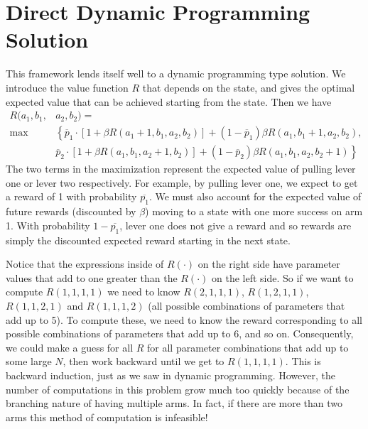 \section*{Direct Dynamic Programming Solution}
This framework lends itself well to a dynamic programming type solution.
We introduce the value function $R$ that depends on the state, and gives
the optimal expected value that can be achieved
starting from the state.  Then we have
\begin{equation}
\label{recurs}
\begin{aligned}
R(a_1,b_1,&a_2,b_2) =\\
 \max&\left\{\overline{p}_1\cdot[1 + \beta R(a_1+1,b_1,a_2,b_2)] +
 (1-\overline{p}_1)\beta R(a_1,b_1+1,a_2,b_2)\right. ,\\
&  \left.\overline{p}_2\cdot[1 + \beta R(a_1,b_1,a_2+1,b_2)] +
(1-\overline{p}_2)\beta R(a_1,b_1,a_2,b_2+1)\right\}
\end{aligned}
\end{equation}
The two terms in the maximization represent the expected value of pulling lever
one or lever two respectively.  For example, by pulling lever one, we expect
to get a reward of 1 with probability $\overline{p_1}$.
We must also account for the expected value of future rewards
(discounted by $\beta$) moving to a state with one more success on arm 1.
With probability $1-\overline{p_1}$, lever one does not give a reward and so
rewards are simply the discounted expected reward starting in the next state.

Notice that the expressions inside of $R(\cdot)$ on the right side have parameter
values that add to one greater than the $R(\cdot)$ on the left side.
So if we want to compute $R(1,1,1,1)$ we need to know
$R(2,1,1,1)$, $R(1,2,1,1)$, $R(1,1,2,1)$ and $R(1,1,1,2)$
(all possible combinations of parameters that add up to 5).
To compute these, we need to know the reward corresponding to all possible
combinations of parameters that add up to 6, and so on.  Consequently, we could
make a guess for all $R$ for all parameter combinations that add up to some large $N$,
then work backward until we get to $R(1,1,1,1)$.  This is backward induction,
just as we saw in dynamic programming.  However, the number of computations in this
problem grow much too quickly because of the branching nature of having multiple arms.
In fact, if there are more than two arms this method of computation is infeasible!


